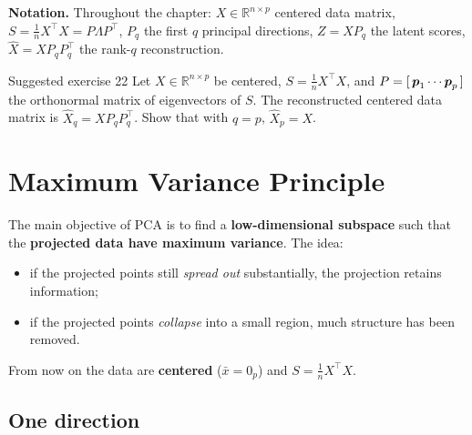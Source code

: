 \textbf{Notation.} Throughout the chapter: $X \in \mathbb{R}^{n \times p}$ centered data matrix,
$S = \frac{1}{n}X^\top X = P\Lambda P^\top$, $P_q$ the first $q$ principal directions,
$Z = XP_q$ the latent scores, $\hat{X} = XP_qP_q^\top$ the rank-$q$ reconstruction.

\begin{Exercise}{Suggested exercise 22}{}
  Let $X \in \mathbb{R}^{n \times p}$ be centered, $S = \frac{1}{n}X^\top X$, and
  $P = [\,\boldsymbol{p}_1 \cdots \boldsymbol{p}_p\,]$ the orthonormal matrix of eigenvectors of $S$.
  The reconstructed centered data matrix is $\hat{X}_q = X P_q P_q^\top$. Show that with $q = p$, $\hat{X}_p = X$.
\end{Exercise}


\section{Maximum Variance Principle}

The main objective of PCA is to find a \textbf{low-dimensional subspace} such that the
\textbf{projected data have maximum variance}. The idea:
\begin{itemize}
  \item if the projected points still \emph{spread out} substantially, the projection retains information;
  \item if the projected points \emph{collapse} into a small region, much structure has been removed.
\end{itemize}

From now on the data are \textbf{centered} ($\bar{x} = 0_p$) and $S = \frac{1}{n}X^\top X$.


\subsection{One direction}

